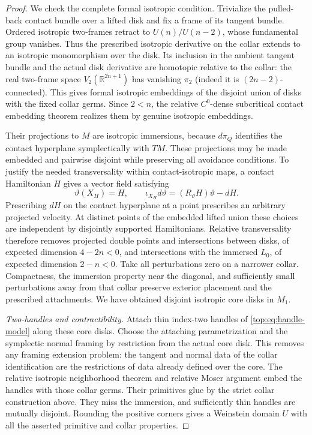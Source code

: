 \documentclass[11pt]{article}
\numberwithin{equation}{section}
\theoremstyle{definition}
\theoremstyle{remark}
\newcommand{\R}{\mathbb R}
\begin{document}
\begin{proof}
We check the complete formal isotropic condition.  Trivialize
the pulled-back contact bundle over a lifted disk and fix a
frame of its tangent bundle.  Ordered isotropic two-frames
retract to $U(n)/U(n-2)$, whose fundamental group vanishes.
Thus the prescribed isotropic derivative on the collar extends
to an isotropic monomorphism over the disk.  Its inclusion in
the ambient tangent bundle and the actual disk derivative are
homotopic relative to the collar: the real two-frame space
$V_2(\R^{2n+1})$ has vanishing $\pi_2$ (indeed it is
$(2n-2)$-connected).  This gives formal isotropic embeddings
of the disjoint union of disks with the fixed collar germs.
Since $2<n$, the relative $C^0$-dense subcritical contact
embedding theorem \cite[Theorem~12.4.1]{Top:EMbook} realizes
them by genuine isotropic embeddings.

Their projections to $M$ are isotropic immersions, because
$d\pi_Q$ identifies the contact hyperplane symplectically with
$TM$.  These projections may be made embedded and pairwise
disjoint while preserving all avoidance conditions.  To justify
the needed transversality within contact-isotropic maps, a
contact Hamiltonian $H$ gives a vector field satisfying
\[
 \vartheta(X_H)=H,\qquad
 \iota_{X_H}d\vartheta=(R_\vartheta H)\vartheta-dH.
\]
Prescribing $dH$ on the contact hyperplane at a point prescribes
an arbitrary projected velocity.  At distinct points of the
embedded lifted union these choices are independent by
disjointly supported Hamiltonians.  Relative transversality
therefore removes projected double points and intersections
between disks, of expected dimension $4-2n<0$, and intersections
with the immersed $L_0$, of expected dimension $2-n<0$.
Take all perturbations zero on a narrower collar.  Compactness,
the immersion property near the diagonal, and sufficiently
small perturbations away from that collar preserve exterior
placement and the prescribed attachments.  We have obtained
disjoint isotropic core disks in $M_1$.

\emph{Two-handles and contractibility.}
Attach thin index-two handles of \eqref{top:eq:handle-model}
along these core disks.  Choose the attaching parametrization
and the symplectic normal framing by restriction from the
actual core disk.  This removes any framing extension problem:
the tangent and normal data of the collar identification are
the restrictions of data already defined over the core.
The relative isotropic neighborhood theorem and relative
Moser argument embed the handles with those collar germs.
Their primitives glue by the strict collar construction above.
They miss the immersion, and sufficiently thin handles are
mutually disjoint.  Rounding the positive corners gives a
Weinstein domain $U$ with all the asserted primitive and
collar properties.


\end{proof}
\end{document}
